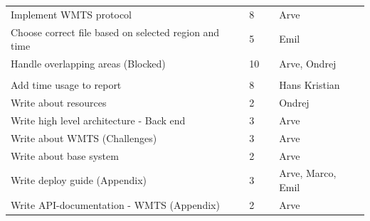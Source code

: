 \documentclass[11pt,a4paper,titlepage,oneside]{report}
\begin{document}
\begin{table}[h]
{\begin{tabular}{llll}
Implement \gls{WMTS} \gls{protocol}                                & 8                                                                   &                                                         & Arve                       \\
Choose correct file based on selected region and time  & 5                                                                   &                                                         & Emil                       \\
Handle overlapping areas (Blocked)                     & 10                                                                  &                                                         & Arve, Ondrej               \\
\rowcolor[HTML]{C0C0C0} 
\multicolumn{4}{l}{\cellcolor[HTML]{C0C0C0}\textbf{Reporting}}                                                                                                                                                      \\
Add time usage to report                               & 8                                                                   &                                                         & Hans Kristian              \\
Write about resources                                  & 2                                                                   &                                                         & Ondrej                     \\
Write high level architecture - Back end               & 3                                                                   &                                                         & Arve                       \\
Write about \gls{WMTS} (Challenges)                          & 3                                                                   &                                                         & Arve                       \\
Write about base system                                & 2                                                                   &                                                         & Arve                       \\
Write deploy guide (Appendix)                          & 3                                                                   &                                                         & Arve, Marco, Emil          \\
Write \gls{API}-documentation - \gls{WMTS} (Appendix)              & 2                                                                   &                                                         & Arve                       \\

\end{tabular}}
\end{table}
\end{document}
